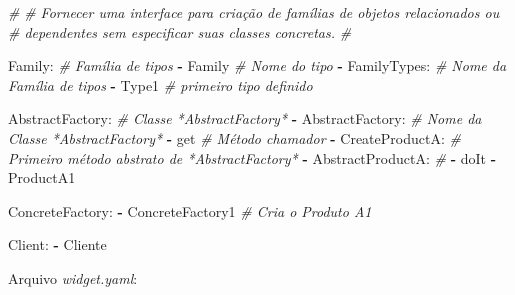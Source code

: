 \documentclass[]{article}
\newenvironment{Shaded}{}{}
\newcommand{\KeywordTok}[1]{\textcolor[rgb]{0.00,0.44,0.13}{\textbf{{#1}}}}
\newcommand{\CommentTok}[1]{\textcolor[rgb]{0.38,0.63,0.69}{\textit{{#1}}}}
\newcommand{\FunctionTok}[1]{\textcolor[rgb]{0.02,0.16,0.49}{{#1}}}
\newcommand{\NormalTok}[1]{{#1}}
\begin{document}
\begin{Shaded}
\begin{Highlighting}[]
\CommentTok{#}
\CommentTok{# Fornecer uma interface para criação de famílias de objetos relacionados ou}
\CommentTok{# dependentes sem especificar suas classes concretas.}
\CommentTok{#}

\FunctionTok{Family:}                     \CommentTok{# Família de tipos}
\KeywordTok{-} \NormalTok{Family                    }\CommentTok{# Nome do tipo}
\KeywordTok{-} \FunctionTok{FamilyTypes:}              \CommentTok{# Nome da Família de tipos}
    \KeywordTok{-} \NormalTok{Type1                 }\CommentTok{# primeiro tipo definido}

\FunctionTok{AbstractFactory:}            \CommentTok{# Classe *AbstractFactory*}
\KeywordTok{-} \FunctionTok{AbstractFactory:}          \CommentTok{# Nome da Classe *AbstractFactory*}
    \KeywordTok{-} \NormalTok{get                   }\CommentTok{# Método chamador}
    \KeywordTok{-} \FunctionTok{CreateProductA:}       \CommentTok{# Primeiro método abstrato de *AbstractFactory*}
        \KeywordTok{-} \FunctionTok{AbstractProductA:} \CommentTok{# }
            \KeywordTok{-} \NormalTok{doIt}
            \KeywordTok{-} \NormalTok{ProductA1}

\FunctionTok{ConcreteFactory:}
\KeywordTok{-} \NormalTok{ConcreteFactory1          }\CommentTok{# Cria o Produto A1}

\FunctionTok{Client:}
\KeywordTok{-} \NormalTok{Cliente}
\end{Highlighting}
\end{Shaded}

\clearpage
Arquivo \emph{widget.yaml}:
\end{document}
